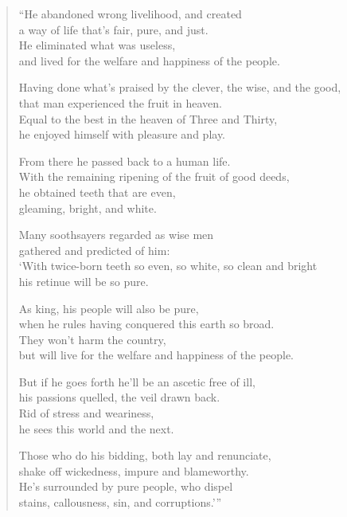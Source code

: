 \documentclass[12pt,openany]{book}%
\begin{document}
\begin{verse}%
“He abandoned wrong livelihood, and created \\
a way of life that’s fair, pure, and just. \\
He eliminated what was useless, \\
and lived for the welfare and happiness of the people. 

Having done what’s praised by the clever, the wise, and the good, \\
that man experienced the fruit in heaven. \\
Equal to the best in the heaven of Three and Thirty, \\
he enjoyed himself with pleasure and play. 

From there he passed back to a human life. \\
With the remaining ripening of the fruit of good deeds, \\
he obtained teeth that are even, \\
gleaming, bright, and white. 

Many soothsayers regarded as wise men \\
gathered and predicted of him: \\
‘With twice-born teeth so even, so white, so clean and bright \\
his retinue will be so pure. 

As king, his people will also be pure, \\
when he rules having conquered this earth so broad. \\
They won’t harm the country, \\
but will live for the welfare and happiness of the people. 

But if he goes forth he’ll be an ascetic free of ill, \\
his passions quelled, the veil drawn back. \\
Rid of stress and weariness, \\
he sees this world and the next. 

Those who do his bidding, both lay and renunciate, \\
shake off wickedness, impure and blameworthy. \\
He’s surrounded by pure people, who dispel \\
stains, callousness, sin, and corruptions.’” 

%
\end{verse}
\end{document}
